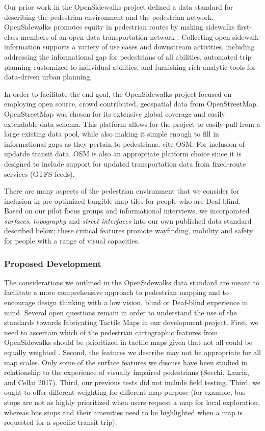 Our prior work in the OpenSidewalks project defined a data standard for describing the pedestrian environment and the pedestrian network. OpenSidewalks promotes equity in pedestrian routes by making sidewalks first-class members of an open data transportation network \cite{bolten2017}. Collecting open sidewalk information supports a variety of use cases and downstream activities, including addressing the informational gap for pedestrians of all abilities, automated trip planning customized to individual abilities, and furnishing rich analytic tools for data-driven urban planning. 

In order to facilitate the end goal, the OpenSidewalks project focused on employing open source, crowd contributed, geospatial data from OpenStreetMap. OpenStreetMap was chosen for its extensive global coverage and easily extendable data schema. This platform allows for the project to easily pull from a large existing data pool, while also making it simple enough to fill in informational gaps as they pertain to pedestrians. \ac{cite OSM}. For inclusion of updatde transit data, OSM is also an appropriate platform choice since it is designed to include support for updated transportation data from fixed-route services (GTFS feeds).

There are many aspects of the pedestrian environment that we consider for inclusion in pre-optimized tangible map tiles for people who are Deaf-blind.  Based on our pilot focus groups and informational interviews, we incorporated \textit{surfaces}, \textit{topography} and \textit{street interfaces} into our own published data standard described below; these critical features promote wayfinding, mobility and safety for people with a range of visual capacities. 

\subsubsection{Proposed Development}

The considerations we outlined in the OpenSidewalks data standard are meant to facilitate a more comprehensive approach to pedestrian mapping and to encourage design thinking with a low vision, blind or Deaf-blind experience in mind. Several open questions remain in order to understand the use of the standards towards fabricating Tactile Maps in our development project. First, we need to ascertain which of the pedestrian cartographic features from OpenSidewalks should be prioritized in tactile maps given that not all could be equally weighted \cite{haberling2008proposed}.
Second, the features we describe may not be appropriate for all map scales.  Only some of the surface features we discuss have been studied in relationship to the experience of visually impaired pedestrians (Secchi, Lauria, and Cellai 2017). 
Third, our previous tests did not include field testing. 
Third, we ought to offer different weighting for different map purpose (for example, bus stops are not as highly prioritized when users request a map for local exploration, whereas bus stops and their amenities need to be highlighted when a map is requested for a specific transit trip).


